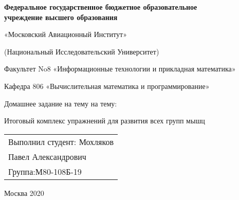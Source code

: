 
\vskip 6cm

\begin{titlepage}
\large
  \begin{center}
    {\bfseries  Федеральное государственное бюджетное образовательное \\
     учреждение высшего образования}

    «Московский Авиационный Институт»

    (Национальный Исследовательский Университет)

    Факультет No8 «Информационные технологии и прикладная математика»

    Кафедра 806 «Вычислительная математика и программирование»

    Домашнее задание на тему на тему:

    Итоговый комплекс упражнений для развития всех групп мышц
  \end{center}

  \vspace{14cm}

  \begin{flushright}
    \begin{tabular}{l}
      Выполнил студент: Мохляков \\
      Павел Александрович \\
      Группа:М80-108Б-19 \\
    \end{tabular}
  \end{flushright}

  \vspace{3cm}

\begin{center}
  Москва 2020
\end{center}

\newpage
\end{titlepage}
